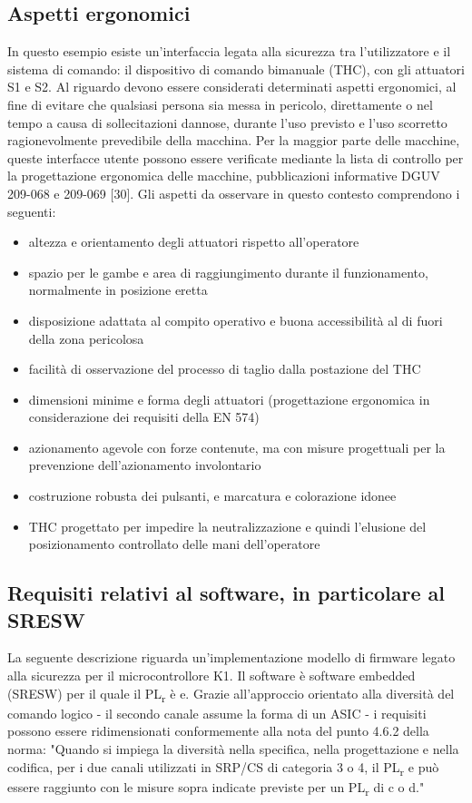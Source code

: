 \subsection{Aspetti ergonomici}
\label{subsec:06-5-8}
In questo esempio esiste un'interfaccia legata alla sicurezza tra l'utilizzatore e il sistema di comando: il dispositivo di comando bimanuale (THC), con gli attuatori S1 e S2. Al riguardo devono essere considerati determinati aspetti ergonomici, al fine di evitare che qualsiasi persona sia messa in pericolo, direttamente o nel tempo a causa di sollecitazioni dannose, durante l'uso previsto e l'uso scorretto ragionevolmente prevedibile della macchina. Per la maggior parte delle macchine, queste interfacce utente possono essere verificate mediante la lista di controllo per la progettazione ergonomica delle macchine, pubblicazioni informative DGUV 209-068 e 209-069 [30]. Gli aspetti da osservare in questo contesto comprendono i seguenti:
\begin{itemize}
    \item altezza e orientamento degli attuatori rispetto all'operatore
    \item spazio per le gambe e area di raggiungimento durante il funzionamento, normalmente in posizione eretta
    \item disposizione adattata al compito operativo e buona accessibilità al di fuori della zona pericolosa
    \item facilità di osservazione del processo di taglio dalla postazione del THC
    \item dimensioni minime e forma degli attuatori (progettazione ergonomica in considerazione dei requisiti della EN 574)
    \item azionamento agevole con forze contenute, ma con misure progettuali per la prevenzione dell'azionamento involontario
    \item costruzione robusta dei pulsanti, e marcatura e colorazione idonee
    \item THC progettato per impedire la neutralizzazione e quindi l'elusione del posizionamento controllato delle mani dell'operatore
\end{itemize}

\subsection{Requisiti relativi al software, in particolare al SRESW}
\label{subsec:06-5-9}
La seguente descrizione riguarda un'implementazione modello di firmware legato alla sicurezza per il microcontrollore K1. Il software è software embedded (SRESW) per il quale il PL\textsubscript{r} è e. Grazie all'approccio orientato alla diversità del comando logico - il secondo canale assume la forma di un ASIC - i requisiti possono essere ridimensionati conformemente alla nota del punto 4.6.2 della norma: "Quando si impiega la diversità nella specifica, nella progettazione e nella codifica, per i due canali utilizzati in SRP/CS di categoria 3 o 4, il PL\textsubscript{r} e può essere raggiunto con le misure sopra indicate previste per un PL\textsubscript{r} di c o d."

